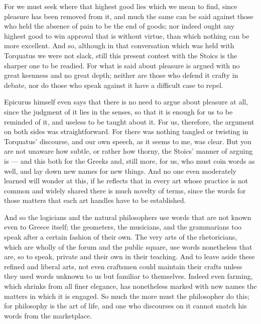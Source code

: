  For we must seek where that highest good lies which we mean to find, since pleasure has been removed from it, and much the same can be said against those who held the absence of pain to be the end of goods; nor indeed ought any highest good to win approval that is without virtue, than which nothing can be more excellent. And so, although in that conversation which was held with Torquatus we were not slack, still this present contest with the Stoics is the sharper one to be readied. For what is said about pleasure is argued with no great keenness and no great depth; neither are those who defend it crafty in debate, nor do those who speak against it have a difficult case to repel.

 Epicurus himself even says that there is no need to argue about pleasure at all, since the judgment of it lies in the senses, so that it is enough for us to be reminded of it, and useless to be taught about it. For us, therefore, the argument on both sides was straightforward. For there was nothing tangled or twisting in Torquatus' discourse, and our own speech, as it seems to me, was clear. But you are not unaware how subtle, or rather how thorny, the Stoics' manner of arguing is — and this both for the Greeks and, still more, for us, who must coin words as well, and lay down new names for new things. And no one even moderately learned will wonder at this, if he reflects that in every art whose practice is not common and widely shared there is much novelty of terms, since the words for those matters that each art handles have to be established.

 And so the logicians and the natural philosophers use words that are not known even to Greece itself; the geometers, the musicians, and the grammarians too speak after a certain fashion of their own. The very arts of the rhetoricians, which are wholly of the forum and the public square, use words nonetheless that are, so to speak, private and their own in their teaching. And to leave aside these refined and liberal arts, not even craftsmen could maintain their crafts unless they used words unknown to us but familiar to themselves. Indeed even farming, which shrinks from all finer elegance, has nonetheless marked with new names the matters in which it is engaged. So much the more must the philosopher do this; for philosophy is the art of life, and one who discourses on it cannot snatch his words from the marketplace.

